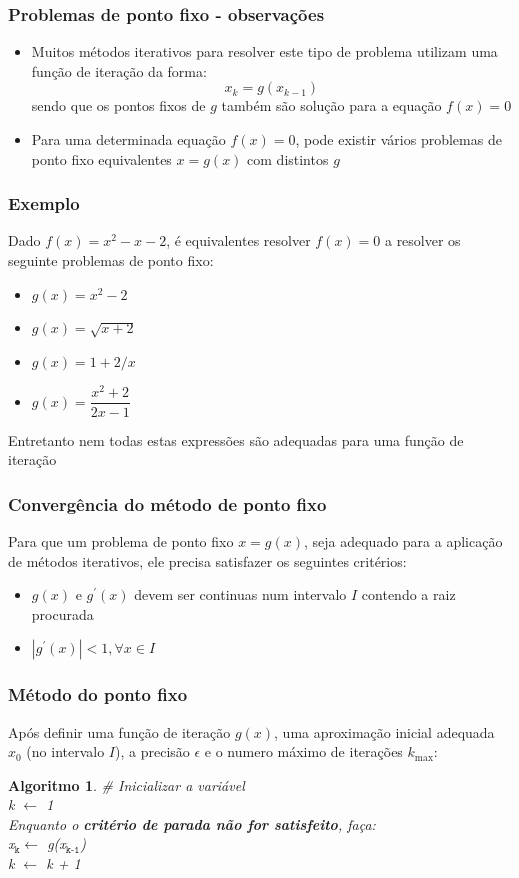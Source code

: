 \documentclass{beamer}
\theoremstyle{mystyle}
\newtheorem{algoritmo}[theorem]{Algoritmo}
\begin{document}
\begin{frame}
	\frametitle{Problemas de ponto fixo - observações}
	\begin{itemize}
		\item Muitos métodos iterativos para resolver este tipo de problema utilizam uma função de iteração da forma:
		\begin{equation*}
			x_{k} = g(x_{k-1})
		\end{equation*}
		sendo que os pontos fixos de $ g $ também são solução para a equação $ f (x) = 0 $		 
		\item Para uma determinada equação $ f (x) = 0 $, pode existir vários problemas de ponto fixo equivalentes $ x = g(x) $ com distintos $ g $
	\end{itemize} 
\end{frame}

\begin{frame}
	\frametitle{Exemplo}
	Dado $ f (x) = x^{2} - x - 2 $, é equivalentes resolver $ f (x) = 0 $ a resolver os seguinte problemas de ponto fixo:
	\begin{itemize}
		\item $g(x) = x^{2} - 2 $
		\item $g(x) = \sqrt{x + 2} $
		\item $g(x) = 1 + 2/x $
		\item $g(x) = \dfrac{x^{2} + 2}{2x - 1} $		
	\end{itemize}
	\pause
	\alert{Entretanto nem todas estas expressões são adequadas para uma função de iteração}
\end{frame}

\begin{frame}
	\frametitle{Convergência do método de ponto fixo}
	Para que um problema de ponto fixo $ x = g(x) $, seja adequado para a aplicação de métodos iterativos, ele precisa satisfazer os seguintes critérios: 
	\begin{itemize}
		\item $ g(x) $ e $ g^{\prime}(x) $ devem ser continuas num intervalo $ I $ contendo a raiz procurada
		\item $ |g^{\prime}(x)| < 1, \forall x \in I $
	\end{itemize} 
\end{frame}

\begin{frame}
	\frametitle{Método do ponto fixo}
	Após definir uma função de iteração $ g(x) $, uma aproximação inicial adequada $ x_{0} $ (no intervalo $ I $), a precisão $ \epsilon $ e o numero máximo de iterações $ k_{\text{max}} $:
	\begin{algoritmo}
		\# Inicializar a variável\\
		 k $\leftarrow$ 1\\ 
		Enquanto o \textbf{critério de parada não for satisfeito}, faça:\\
		\quad x$ _{\texttt{k}} \leftarrow $ g(x$ _{\texttt{k-1}}$) \\
		\quad k $\leftarrow$ k + 1
	\end{algoritmo}
\end{frame}
\end{document}
